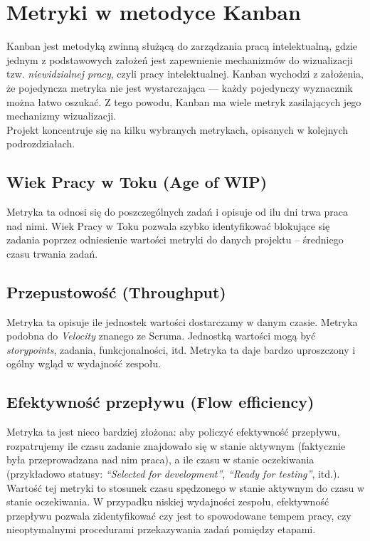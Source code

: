 \section{Metryki w metodyce Kanban}
Kanban jest metodyką zwinną służącą do zarządzania pracą intelektualną, gdzie jednym z podstawowych założeń jest zapewnienie mechanizmów
do wizualizacji tzw. \textit{niewidzialnej pracy}, czyli pracy intelektualnej. Kanban wychodzi z założenia, że pojedyncza metryka nie jest wystarczająca --- każdy
pojedynczy wyznacznik można łatwo oszukać. Z tego powodu, Kanban ma wiele metryk zasilających jego mechanizmy wizualizacji. \\
Projekt koncentruje się na kilku wybranych metrykach, opisanych w kolejnych podrozdziałach.

\subsection{Wiek Pracy w Toku (Age of WIP)}
Metryka ta odnosi się do poszczególnych zadań i opisuje od ilu dni trwa praca nad nimi.
Wiek Pracy w Toku pozwala szybko identyfikować blokujące się zadania poprzez odniesienie wartości metryki do danych projektu -- średniego czasu trwania zadań.

\subsection{Przepustowość (Throughput)}
Metryka ta opisuje ile jednostek wartości dostarczamy w danym czasie. Metryka podobna do \textit{Velocity} znanego ze Scruma. Jednostką wartości mogą być \textit{storypoints}, zadania, funkcjonalności, itd.
Metryka ta daje bardzo uproszczony i ogólny wgląd w wydajność zespołu.

\subsection{Efektywność przepływu (Flow efficiency)}
Metryka ta jest nieco bardziej złożona: aby policzyć efektywność przepływu, rozpatrujemy ile czasu zadanie znajdowało się w stanie aktywnym (faktycznie była przeprowadzana nad nim praca), a ile czasu
w stanie oczekiwania (przykładowo statusy: \textit{``Selected for development''}, \textit{``Ready for testing''}, itd.). Wartość tej metryki to stosunek czasu spędzonego w stanie aktywnym do czasu w stanie oczekiwania.
W przypadku niskiej wydajności zespołu, efektywność przepływu pozwala zidentyfikować czy jest to spowodowane tempem pracy, czy nieoptymalnymi procedurami przekazywania zadań pomiędzy etapami.

